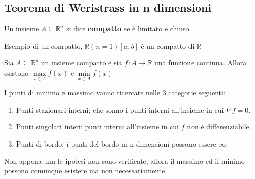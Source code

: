 \subsection{Teorema di Weristrass in n dimensioni}
\begin{definition}[Compatto]
Un insieme $A \subseteq \mathbb{R}^n$ si dice \textbf{compatto} se è limitato e chiuso.
\end{definition}
\begin{example}
Esempio di un compatto, $\mathbb{R}(n=1)[a,b]$ è un compatto di $\mathbb{R}$
\end{example}

\begin{theorem}
Sia $A \subseteq \mathbb{R}^n$ un insieme compatto e sia $f: A \to \mathbb{R}$ una funzione continua. Allora esistono $\max\limits_{x \in A}f(x)$ e $\min\limits_{x \in A}f(x)$
\end{theorem}

\hspace{-15pt}I punti di minimo e massimo vanno ricercate nelle 3 categorie seguenti:
\begin{enumerate}
    \item Punti stazionari interni: che sonno i punti interni all'insieme in cui $\nabla f = 0$.
    \item Punti singolari interi: punti interni all'insieme in cui $f$ non è differenziabile.
    \item Punti di bordo: i punti del bordo in n dimensioni possono essere $\infty$.
\end{enumerate}

\begin{observation}
Non appena una le ipotesi non sono verificate, allora il massimo ed il minimo possono comunque esistere ma non necessariamente.
\end{observation}

